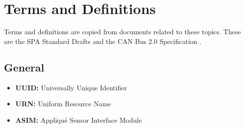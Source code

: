 \section{Terms and Definitions}
Terms and definitions are copied from documents related
to these topics. These are the SPA Standard Drafts
\cite{standard:spa_logical_interface,standard:spa_networking,
standard:spa_spacewire_adaptation,standard:spa_physical_interface,
standard:spa_local_adaptation} and the CAN Bus 2.0 Specification
\cite{standard:can_bus}.

\subsection{General}
\begin{itemize}
    \item \textbf{UUID:} Universally Unique Identifier
    \item \textbf{URN:} Uniform Resource Name
    \item \textbf{ASIM:} Appliqu\'{e} Sensor Interface Module
\end{itemize}

